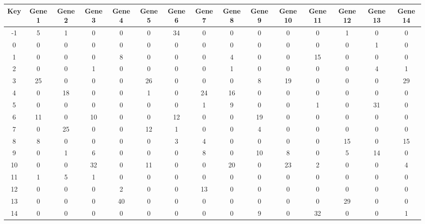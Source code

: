 \begin{tabular}{|c|c|c|c|c|c|c|c|c|c|c|c|c|c|c|}
\hline
Key & Gene 1 & Gene 2 & Gene 3 & Gene 4 & Gene 5 & Gene 6 & Gene 7 & Gene 8 & Gene 9 & Gene 10 & Gene 11 & Gene 12 & Gene 13 & Gene 14 \\
\hline
-1 & 5 & 1 & 0 & 0 & 0 & 34 & 0 & 0 & 0 & 0 & 0 & 1 & 0 & 0 \\
0 & 0 & 0 & 0 & 0 & 0 & 0 & 0 & 0 & 0 & 0 & 0 & 0 & 1 & 0 \\
1 & 0 & 0 & 0 & 8 & 0 & 0 & 0 & 4 & 0 & 0 & 15 & 0 & 0 & 0 \\
2 & 0 & 0 & 1 & 0 & 0 & 0 & 0 & 1 & 0 & 0 & 0 & 0 & 4 & 1 \\
3 & 25 & 0 & 0 & 0 & 26 & 0 & 0 & 0 & 8 & 19 & 0 & 0 & 0 & 29 \\
4 & 0 & 18 & 0 & 0 & 1 & 0 & 24 & 16 & 0 & 0 & 0 & 0 & 0 & 0 \\
5 & 0 & 0 & 0 & 0 & 0 & 0 & 1 & 9 & 0 & 0 & 1 & 0 & 31 & 0 \\
6 & 11 & 0 & 10 & 0 & 0 & 12 & 0 & 0 & 19 & 0 & 0 & 0 & 0 & 0 \\
7 & 0 & 25 & 0 & 0 & 12 & 1 & 0 & 0 & 4 & 0 & 0 & 0 & 0 & 0 \\
8 & 8 & 0 & 0 & 0 & 0 & 3 & 4 & 0 & 0 & 0 & 0 & 15 & 0 & 15 \\
9 & 0 & 1 & 6 & 0 & 0 & 0 & 8 & 0 & 10 & 8 & 0 & 5 & 14 & 0 \\
10 & 0 & 0 & 32 & 0 & 11 & 0 & 0 & 20 & 0 & 23 & 2 & 0 & 0 & 4 \\
11 & 1 & 5 & 1 & 0 & 0 & 0 & 0 & 0 & 0 & 0 & 0 & 0 & 0 & 0 \\
12 & 0 & 0 & 0 & 2 & 0 & 0 & 13 & 0 & 0 & 0 & 0 & 0 & 0 & 0 \\
13 & 0 & 0 & 0 & 40 & 0 & 0 & 0 & 0 & 0 & 0 & 0 & 29 & 0 & 0 \\
14 & 0 & 0 & 0 & 0 & 0 & 0 & 0 & 0 & 9 & 0 & 32 & 0 & 0 & 1 \\
\hline
\end{tabular}